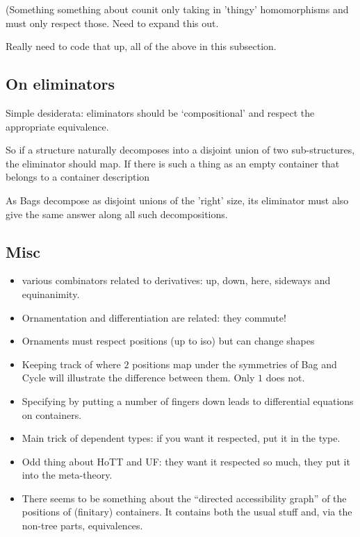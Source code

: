 \documentclass{article} %
\theoremstyle{plain}
\theoremstyle{definition}
\begin{document}
(Something something about counit only taking in 'thingy' homomorphisms
and must only respect those. Need to expand this out.

Really need to code that up, all of the above in this subsection.

\subsection{On eliminators}

Simple desiderata: eliminators should be `compositional' and respect
the appropriate equivalence.

So if a structure naturally decomposes into a disjoint union of
two sub-structures, the eliminator should map. If there is such a thing
as an empty container that belongs to a container description

As Bags decompose as disjoint unions of the 'right' size, its eliminator
must also give the same answer along all such decompositions.

\subsection{Misc}
\begin{itemize}
\item various combinators related to derivatives: up, down, here,
sideways and equinanimity.
\item Ornamentation and differentiation are related: they commute!
\item Ornaments must respect positions (up to iso) but can change shapes
\item Keeping track of where $2$ positions map under the symmetries of
Bag and Cycle will illustrate the difference between them. Only $1$ does not.
\item Specifying by putting a number of fingers down leads to differential
equations on containers.
\item Main trick of dependent types: if you want it respected, put it in
the type.
\item Odd thing about HoTT and UF: they want it respected so much, they put
it into the meta-theory.
\item There seems to be something about the ``directed accessibility
graph'' of the positions of (finitary) containers. It contains both the usual
stuff and, via the non-tree parts, equivalences.
\end{itemize}
\end{document}
